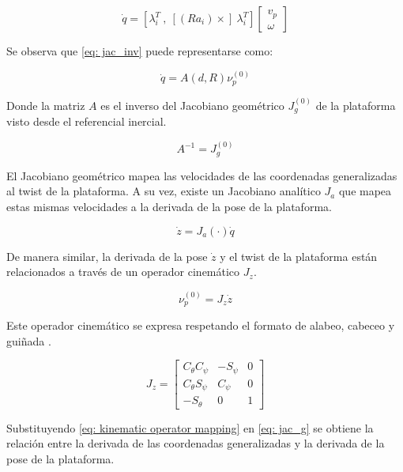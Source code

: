 \begin{equation} \label{eq: jac_inv}
\dot{q} = [\lambda_i^T\ ,\ [(Ra_i)\times]\ \lambda_i^T] \begin{bmatrix}
v_p\\
\omega
\end{bmatrix}
\end{equation}

Se observa que \ref{eq: jac_inv} puede 
representarse como:

\begin{equation} \label{eq: jac_g}
\dot{q} = A(d,R) \nu_p^{(0)}
\end{equation}

Donde la matriz $A$ es el inverso del Jacobiano geométrico 
$J_g^{(0)}$ de la plataforma 
visto desde el referencial inercial. 

\begin{equation}
 A^{-1} = J_g^{(0)}
\end{equation}


El Jacobiano geométrico mapea las velocidades 
de las coordenadas generalizadas al twist de 
la plataforma.
A su vez, existe un Jacobiano analítico $J_a$ que mapea
estas mismas velocidades a la derivada de la pose
de la plataforma.

\begin{equation} \label{eq: jac_a}
\dot{z} = J_a(\cdot)\dot{q}
\end{equation}

De manera similar, la derivada de la pose $\dot z$
y el twist de la plataforma están relacionados 
a través de un operador cinemático $J_z$.

\begin{equation}\label{eq: kinematic operator mapping}
\nu_p^{(0)} = J_z\dot{z}
\end{equation}

Este operador cinemático se expresa respetando 
el formato de alabeo, cabeceo y guiñada \cite{olguin20183d}.

\begin{equation}\label{eq: kinematic operator}
 J_z = \begin{bmatrix}
        C_\theta C_\psi & -S_\psi & 0\\
        C_\theta S_\psi & C_\psi & 0\\
        -S_\theta & 0 & 1
       \end{bmatrix}
\end{equation}

Substituyendo \eqref{eq: kinematic operator mapping}
en \eqref{eq: jac_g} se obtiene la relación entre
la derivada de las coordenadas generalizadas y 
la derivada de la pose de la plataforma.


